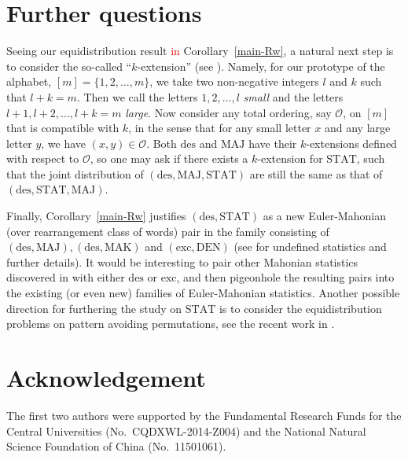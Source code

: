 \documentclass[12pt]{amsart}
\numberwithin{equation}{section}
\theoremstyle{plain}
\theoremstyle{definition}
\def\MAJ{\mathrm{MAJ}}
\def\MAK{\mathrm{MAK}}
\def\STAT{\mathrm{STAT}}
\def\DEN{\mathrm{DEN}}
\def\des{\mathrm{des}}
\def\exc{\mathrm{exc}}
\def\O{\mathcal{O}}
\begin{document}
\section{Further questions}\label{sec:conclusion}

Seeing our equidistribution result \textcolor{red}{in} Corollary~\ref{main-Rw}, a natural next step is to consider the so-called ``$k$-extension'' (see \cite{Han1, Han2, CF}). Namely, for our prototype of the alphabet, $[m]=\{1,2,\ldots,m\}$, we take two non-negative integers $l$ and $k$ such that $l+k=m$. Then we call the letters $1,2,\ldots,l$ \emph{small} and the letters $l+1,l+2,\ldots,l+k=m$ \emph{large}. Now consider any total ordering, say $\O$, on $[m]$ that is compatible with $k$, in the sense that for any small letter $x$ and any large letter $y$, we have $(x,y)\in \O$. Both $\des$ and $\MAJ$ have their $k$-extensions defined with respect to $\O$, so one may ask if there exists a $k$-extension for $\STAT$, such that the joint distribution of $(\des, \MAJ, \STAT)$ are still the same as that of $(\des, \STAT, \MAJ)$.
 
Finally, Corollary~\ref{main-Rw} justifies $(\des, \STAT)$ as a new Euler-Mahonian (over rearrangement class of words) pair in the family consisting of $(\des, \MAJ), (\des, \MAK)$ and $(\exc, \DEN)$ (see \cite{CSZ} for undefined statistics and further details). It would be interesting to pair other Mahonian statistics discovered in \cite{BS} with either $\des$ or $\exc$, and then pigeonhole the resulting pairs into the existing (or even new) families of Euler-Mahonian statistics. Another possible direction for furthering the study on $\STAT$ is to consider the equidistribution problems on pattern avoiding permutations, see the recent work in \cite{Am, Ch}.




\section*{Acknowledgement}
The first two authors were supported by the Fundamental Research Funds for the Central Universities (No.~CQDXWL-2014-Z004) and the National Natural Science Foundation of China (No.~11501061).
\end{document}
